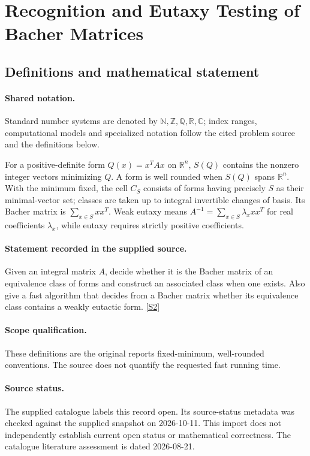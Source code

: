 \documentclass[11pt]{article}
\newcommand{\sref}[2]{\hyperlink{source:#1:#2}{[S#2]}}
\begin{document}
\section{Recognition and Eutaxy Testing of Bacher Matrices}\label{statement}

\subsection{Definitions and mathematical statement}

\paragraph{Shared notation.}Standard number systems are denoted by $\mathbb N,\mathbb Z,\mathbb Q,\mathbb R,\mathbb C$; index ranges, computational models and specialized notation follow the cited problem source and the definitions below.


For a positive-definite form $Q(x)=x^TAx$ on $\mathbb R^n$, $S(Q)$ contains the nonzero integer vectors minimizing $Q$. A form is well rounded when $S(Q)$ spans $\mathbb R^n$. With the minimum fixed, the cell $C_S$ consists of forms having precisely $S$ as their minimal-vector set; classes are taken up to integral invertible changes of basis. Its Bacher matrix is $\sum_{x\in S}xx^T$. Weak eutaxy means $A^{-1}=\sum_{x\in S}\lambda_xxx^T$ for real coefficients $\lambda_x$, while eutaxy requires strictly positive coefficients.
\paragraph{Statement recorded in the supplied source.}
Given an integral matrix $A$, decide whether it is the Bacher matrix of an equivalence class of forms and construct an associated class when one exists. Also give a fast algorithm that decides from a Bacher matrix whether its equivalence class contains a weakly eutactic form. \sref{statement}{2}
\paragraph{Scope qualification.}
These definitions are the original report\textquotesingle s fixed-minimum, well-rounded conventions. The source does not quantify the requested fast running time.
\paragraph{Source status.}
The supplied catalogue labels this record open. Its source-status metadata was checked against the supplied snapshot on 2026-10-11. This import does not independently establish current open status or mathematical correctness. The catalogue literature assessment is dated 2026-08-21.
\end{document}
